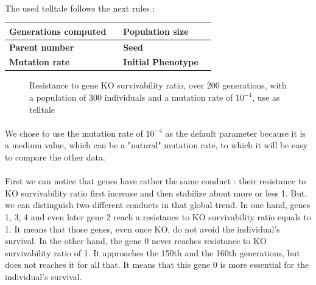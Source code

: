 \documentclass[]{report} %
\makeatletter
\newcommand{\simulationParameters}[1]{%
        \setkeys[SIMPAR]{fam}{#1}
        \begin{tabular}{|l|c||l|c|}
        \hline
        \textbf{Generations computed} & \cmdSIMPAR@fam@generations & \textbf{Population size}     & \cmdSIMPAR@fam@popsize \\ \hline
        \textbf{Parent number}        & \cmdSIMPAR@fam@parents     & \textbf{Seed}                & \cmdSIMPAR@fam@seed    \\ \hline
        \textbf{Mutation rate}        & \cmdSIMPAR@fam@mutationrate& \textbf{Initial Phenotype}   & \cmdSIMPAR@fam@initialpheno \\ \hline
        \end{tabular}
}
\makeatother
\begin{document}
    \paragraph*{}
    The used telltale follows the next rules :\\
    \simulationParameters{}
    \begin{figure}[H] 
      \centering
      \caption{\footnotesize Resistance to gene KO survivability ratio, over 200 generations, with a population of 300 individuals and a mutation rate of $10^{-4}$, use as telltale}
      \label{fig:ps300xg200xmr1-10-4}
    \end{figure}
    \paragraph*{}
    We chose to use the mutation rate of $10^{-4}$ as the default parameter because it is a medium value, which can be a "natural" mutation rate, to which it will be easy to compare the other data.
    \paragraph*{}
    First we can notice that genes have rather the same conduct : their resistance to KO survivability ratio first increase and then stabilize about more or less 1. But, we can distinguish two different conducts in that global trend. In one hand, genes 1, 3, 4 and even later gene 2 reach a resistance to KO survivability ratio equals to 1. It means that those genes, even once KO, do not avoid the individual's survival. In the other hand, the gene 0 never reaches resistance to KO survivability ratio of 1. It approaches the 150th and the 160th generations, but does not reaches it for all that. It means that this gene 0 is more essential for the individual's survival.
\end{document}
